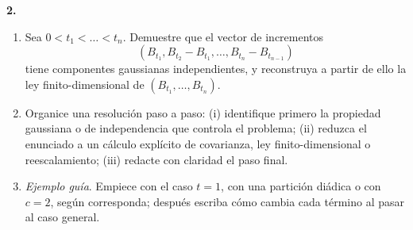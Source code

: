 \documentclass[11pt, letterpaper]{article}
\begin{document}
\newpage

\begin{ejercicio}
    \textbf{2.} 
    \begin{enumerate}
        \item Sea $0 < t_1 < \dots < t_n$. Demuestre que el vector de incrementos
        \[ (B_{t_1}, B_{t_2} - B_{t_1}, \dots, B_{t_n} - B_{t_{n-1}}) \]
        tiene componentes gaussianas independientes, y reconstruya a partir de ello la ley finito-dimensional de $(B_{t_1}, \dots, B_{t_n})$.
        \item Organice una resolución paso a paso: (i) identifique primero la propiedad gaussiana o de independencia que controla el problema; (ii) reduzca el enunciado a un cálculo explícito de covarianza, ley finito-dimensional o reescalamiento; (iii) redacte con claridad el paso final.
        \item \textit{Ejemplo guía}. Empiece con el caso $t=1$, con una partición diádica o con $c=2$, según corresponda; después escriba cómo cambia cada término al pasar al caso general.
    \end{enumerate}
\end{ejercicio}

\vspace{5mm}
\end{document}
